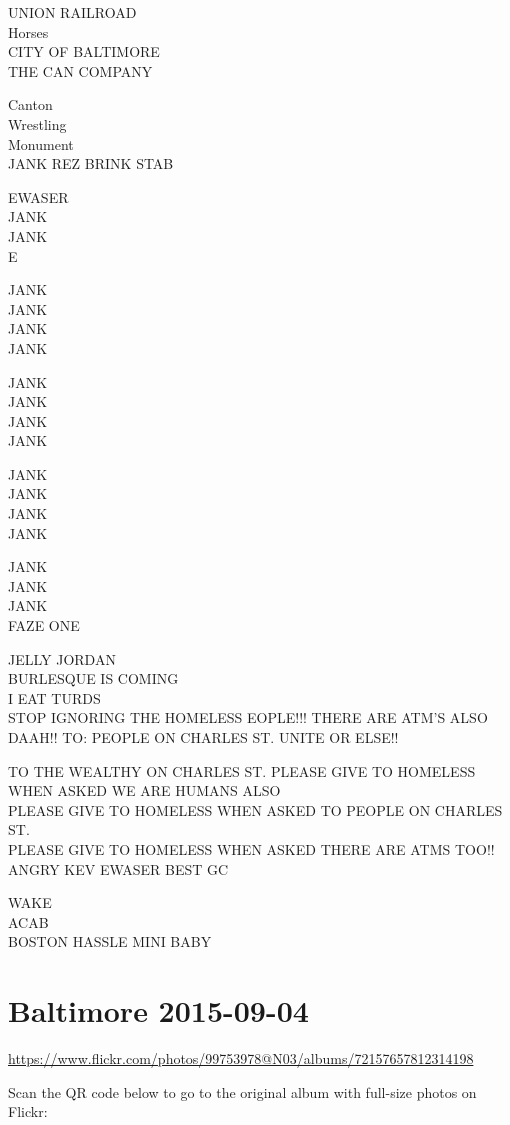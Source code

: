 \documentclass[10pt,letterpaper]{article}
\begin{document}
UNION RAILROAD\\
Horses\\
CITY OF BALTIMORE\\
THE CAN COMPANY

Canton\\
Wrestling\\
Monument\\
JANK REZ BRINK STAB

EWASER\\
JANK\\
JANK\\
E

JANK\\
JANK\\
JANK\\
JANK

JANK\\
JANK\\
JANK\\
JANK

JANK\\
JANK\\
JANK\\
JANK

JANK\\
JANK\\
JANK\\
FAZE ONE

JELLY JORDAN\\
BURLESQUE IS COMING\\
I EAT TURDS\\
STOP IGNORING THE HOMELESS EOPLE!!! THERE ARE ATM'S ALSO DAAH!! TO: PEOPLE ON CHARLES ST. UNITE OR ELSE!!

TO THE WEALTHY ON CHARLES ST.  PLEASE GIVE TO HOMELESS WHEN ASKED WE ARE HUMANS ALSO\\
PLEASE GIVE TO HOMELESS WHEN ASKED TO PEOPLE ON CHARLES ST.\\
PLEASE GIVE TO HOMELESS WHEN ASKED THERE ARE ATMS TOO!!\\
ANGRY KEV EWASER BEST GC

WAKE\\
ACAB\\
BOSTON HASSLE MINI BABY


\section*{Baltimore 2015-09-04}

\url{https://www.flickr.com/photos/99753978@N03/albums/72157657812314198}

Scan the QR code below to go to the original album with full-size photos on Flickr:
\end{document}
